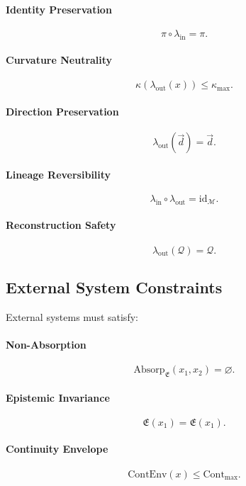 \paragraph{Identity Preservation}
\[
\pi \circ \lambda_{\mathrm{in}} = \pi.
\]

\paragraph{Curvature Neutrality}
\[
\kappa(\lambda_{\mathrm{out}}(x)) \le \kappa_{\max}.
\]

\paragraph{Direction Preservation}
\[
\lambda_{\mathrm{out}}(\vec{d}) = \vec{d}.
\]

\paragraph{Lineage Reversibility}
\[
\lambda_{\mathrm{in}} \circ \lambda_{\mathrm{out}} = \mathrm{id}_{\mathcal{M}}.
\]

\paragraph{Reconstruction Safety}
\[
\lambda_{\mathrm{out}}(\mathcal{Q}) = \mathcal{Q}.
\]


\subsection{External System Constraints}

External systems must satisfy:

\paragraph{Non-Absorption}
\[
\mathrm{Absorp}_{\mathfrak{E}}(x_1, x_2) = \varnothing.
\]

\paragraph{Epistemic Invariance}
\[
\mathfrak{E}(x_1) = \mathfrak{E}(x_1).
\]

\paragraph{Continuity Envelope}
\[
\mathrm{ContEnv}(x) \le \mathrm{Cont}_{\max}.
\]

